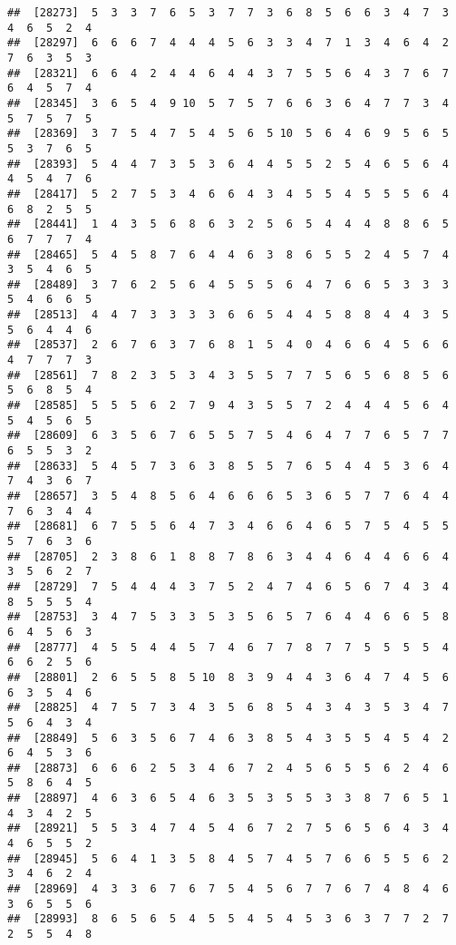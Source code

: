 \documentclass[
]{book}
\begin{document}
\begin{verbatim}
##  [28273]  5  3  3  7  6  5  3  7  7  3  6  8  5  6  6  3  4  7  3  4  6  5  2  4
##  [28297]  6  6  6  7  4  4  4  5  6  3  3  4  7  1  3  4  6  4  2  7  6  3  5  3
##  [28321]  6  6  4  2  4  4  6  4  4  3  7  5  5  6  4  3  7  6  7  6  4  5  7  4
##  [28345]  3  6  5  4  9 10  5  7  5  7  6  6  3  6  4  7  7  3  4  5  7  5  7  5
##  [28369]  3  7  5  4  7  5  4  5  6  5 10  5  6  4  6  9  5  6  5  5  3  7  6  5
##  [28393]  5  4  4  7  3  5  3  6  4  4  5  5  2  5  4  6  5  6  4  4  5  4  7  6
##  [28417]  5  2  7  5  3  4  6  6  4  3  4  5  5  4  5  5  5  6  4  6  8  2  5  5
##  [28441]  1  4  3  5  6  8  6  3  2  5  6  5  4  4  4  8  8  6  5  6  7  7  7  4
##  [28465]  5  4  5  8  7  6  4  4  6  3  8  6  5  5  2  4  5  7  4  3  5  4  6  5
##  [28489]  3  7  6  2  5  6  4  5  5  5  6  4  7  6  6  5  3  3  3  5  4  6  6  5
##  [28513]  4  4  7  3  3  3  3  6  6  5  4  4  5  8  8  4  4  3  5  5  6  4  4  6
##  [28537]  2  6  7  6  3  7  6  8  1  5  4  0  4  6  6  4  5  6  6  4  7  7  7  3
##  [28561]  7  8  2  3  5  3  4  3  5  5  7  7  5  6  5  6  8  5  6  5  6  8  5  4
##  [28585]  5  5  5  6  2  7  9  4  3  5  5  7  2  4  4  4  5  6  4  5  4  5  6  5
##  [28609]  6  3  5  6  7  6  5  5  7  5  4  6  4  7  7  6  5  7  7  6  5  5  3  2
##  [28633]  5  4  5  7  3  6  3  8  5  5  7  6  5  4  4  5  3  6  4  7  4  3  6  7
##  [28657]  3  5  4  8  5  6  4  6  6  6  5  3  6  5  7  7  6  4  4  7  6  3  4  4
##  [28681]  6  7  5  5  6  4  7  3  4  6  6  4  6  5  7  5  4  5  5  5  7  6  3  6
##  [28705]  2  3  8  6  1  8  8  7  8  6  3  4  4  6  4  4  6  6  4  3  5  6  2  7
##  [28729]  7  5  4  4  4  3  7  5  2  4  7  4  6  5  6  7  4  3  4  8  5  5  5  4
##  [28753]  3  4  7  5  3  3  5  3  5  6  5  7  6  4  4  6  6  5  8  6  4  5  6  3
##  [28777]  4  5  5  4  4  5  7  4  6  7  7  8  7  7  5  5  5  5  4  6  6  2  5  6
##  [28801]  2  6  5  5  8  5 10  8  3  9  4  4  3  6  4  7  4  5  6  6  3  5  4  6
##  [28825]  4  7  5  7  3  4  3  5  6  8  5  4  3  4  3  5  3  4  7  5  6  4  3  4
##  [28849]  5  6  3  5  6  7  4  6  3  8  5  4  3  5  5  4  5  4  2  6  4  5  3  6
##  [28873]  6  6  6  2  5  3  4  6  7  2  4  5  6  5  5  6  2  4  6  5  8  6  4  5
##  [28897]  4  6  3  6  5  4  6  3  5  3  5  5  3  3  8  7  6  5  1  4  3  4  2  5
##  [28921]  5  5  3  4  7  4  5  4  6  7  2  7  5  6  5  6  4  3  4  4  6  5  5  2
##  [28945]  5  6  4  1  3  5  8  4  5  7  4  5  7  6  6  5  5  6  2  3  4  6  2  4
##  [28969]  4  3  3  6  7  6  7  5  4  5  6  7  7  6  7  4  8  4  6  3  6  5  5  6
##  [28993]  8  6  5  6  5  4  5  5  4  5  4  5  3  6  3  7  7  2  7  2  5  5  4  8

\end{verbatim}
\end{document}
